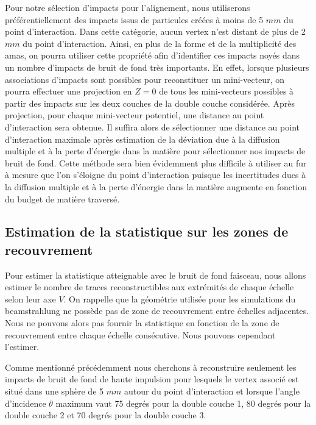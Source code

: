   \medskip
  
  Pour notre s\'election d'impacts pour l'alignement, nous utiliserons pr\'ef\'erentiellement des impacts issus de particules cr\'e\'ees \`a moins de 5 $mm$ du point d'interaction. Dans cette cat\'egorie, aucun vertex n'est distant de plus de 2 $mm$ du point d'interaction. Ainsi, en plus de la forme et de la multiplicit\'e des amas, on pourra utiliser cette propri\'et\'e afin d'identifier ces impacts noy\'es dans un nombre d'impacts de bruit de fond tr\`es importants. En effet, lorsque plusieurs associations d'impacts sont possibles pour reconstituer un mini-vecteur, on pourra effectuer une projection en $Z=0$ de tous les mini-vecteurs possibles \`a partir des impacts sur les deux couches de la double couche consid\'er\'ee. Apr\`es projection, pour chaque mini-vecteur potentiel, une distance au point d'interaction sera obtenue. Il suffira alors de sélectionner une distance au point d'interaction maximale après estimation de la d\'eviation due \`a la diffusion multiple et \`a la perte d'\'energie dans la mati\`ere pour sélectionner nos impacts de bruit de fond. Cette m\'ethode sera bien évidemment plus difficile \`a utiliser au fur \`a mesure que l'on s'\'eloigne du point d'interaction puisque les incertitudes dues \`a la diffusion multiple et \`a la perte d'\'energie dans la mati\`ere augmente en fonction du budget de mati\`ere travers\'e.
  
  \FloatBarrier
 
  \subsection{Estimation de la statistique sur les zones de recouvrement}
  \label{sect:stat_ZR_background}
   
  Pour estimer la statistique atteignable avec le bruit de fond faisceau, nous allons estimer le nombre de traces reconstructibles aux extr\'emités de chaque \'echelle selon leur axe $V$. On rappelle que la g\'eom\'etrie utilis\'ee pour les simulations du beamstrahlung ne poss\`ede pas de zone de recouvrement entre \'echelles adjacentes. Nous ne pouvons alors pas fournir la statistique en fonction de la zone de recouvrement entre chaque \'echelle cons\'ecutive. Nous pouvons cependant l'estimer.
  
  \medskip

  Comme mentionn\'e pr\'ec\'edemment nous cherchons \`a reconstruire seulement les impacts de bruit de fond de haute impulsion pour lesquels le vertex associ\'e est situ\'e dans une sph\`ere de 5 $mm$ autour du point d'interaction et lorsque l'angle d'incidence $\theta$ maximum vaut 75 degr\'es pour la double couche 1, 80 degr\'es pour la double couche 2 et 70 degr\'es pour la double couche 3.
  
